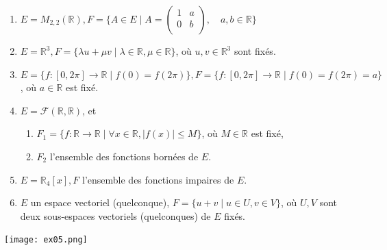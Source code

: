 \documentclass[a4paper, 10pt]{report}
\begin{document}
	\begin{enumerate}[label=\arabic*.]
		\item $E = M_{2, 2}(\mathbb{R}), F = \bigg\{ A \in E
			\mid A = 
			\begin{pmatrix}
				1& a\\
				0& b\\
			\end{pmatrix}
			, \quad a, b \in \mathbb{R} \bigg\}$
		\item $E = \mathbb{R}^3, F = \{\lambda u + \mu v \mid
			\lambda \in \mathbb{R}, \mu \in \mathbb{R}\}$,
		où $u, v \in \mathbb{R}^3$ sont fixés.
		\item $E = \{f : [0, 2\pi] \rightarrow \mathbb{R} \mid
			f(0) = f(2\pi)\}, F = \{f : [0, 2\pi] \rightarrow
			\mathbb{R} \mid f(0) = f(2\pi) = a\}$,
		où $a \in \mathbb{R}$ est fixé.
		\item $E = \mathcal{F}(\mathbb{R}, \mathbb{R})$, et
			\begin{enumerate}[label=(\alph*)]
				\item $F_1 = \{f : \mathbb{R} \rightarrow \mathbb{R}
					\mid \forall x \in \mathbb{R}, |f(x)| \leq M\}$,
					où $M \in \mathbb{R}$ est fixé,
				\item $F_2$ l'ensemble des fonctions bornées de $E$.
			\end{enumerate}
		\item $E = \mathbb{R}_4[x], F$ l'ensemble des fonctions impaires de $E$.
		\item $E$ un espace vectoriel (quelconque), $F = \{u + v 
			\mid u \in U, v \in V\}$, où $U, V$ sont deux
			sous-espaces vectoriels (quelconques) de $E$ fixés.
	\end{enumerate}
	
	\texttt{[image: ex05.png]}
	
\end{document}

